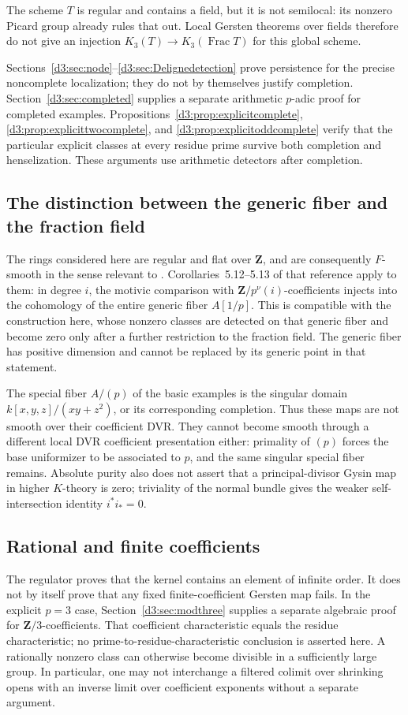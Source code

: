 \documentclass[11pt,a4paper]{amsart}
\numberwithin{equation}{section}
\theoremstyle{definition}
\theoremstyle{remark}
\newcommand{\Z}{\mathbf Z}
\newcommand{\Frac}{\operatorname{Frac}}
\begin{document}
The scheme $T$ is regular and contains a field, but it is not semilocal: its nonzero Picard group already rules that out. Local Gersten theorems over fields therefore do not give an injection $K_3(T)\to K_3(\Frac T)$ for this global scheme.

Sections~\ref{d3:sec:node}--\ref{d3:sec:Delignedetection} prove persistence for the precise noncomplete localization; they do not by themselves justify completion. Section~\ref{d3:sec:completed} supplies a separate arithmetic $p$-adic proof for completed examples. Propositions~\ref{d3:prop:explicitcomplete}, \ref{d3:prop:explicittwocomplete}, and \ref{d3:prop:explicitoddcomplete} verify that the particular explicit classes at every residue prime survive both completion and henselization. These arguments use arithmetic detectors after completion.

\subsection{The distinction between the generic fiber and the fraction field}
The rings considered here are regular and flat over $\Z$, and are consequently $F$-smooth in the sense relevant to \cite{BouisMotivic}. Corollaries~5.12--5.13 of that reference apply to them: in degree $i$, the motivic comparison with $\Z/p^\nu(i)$-coefficients injects into the cohomology of the entire generic fiber $A[1/p]$. This is compatible with the construction here, whose nonzero classes are detected on that generic fiber and become zero only after a further restriction to the fraction field. The generic fiber has positive dimension and cannot be replaced by its generic point in that statement.

The special fiber $A/(p)$ of the basic examples is the singular domain $k[x,y,z]/(xy+z^2)$, or its corresponding completion. Thus these maps are not smooth over their coefficient DVR. They cannot become smooth through a different local DVR coefficient presentation either: primality of $(p)$ forces the base uniformizer to be associated to $p$, and the same singular special fiber remains. Absolute purity also does not assert that a principal-divisor Gysin map in higher $K$-theory is zero; triviality of the normal bundle gives the weaker self-intersection identity $i^*i_*=0$.

\subsection{Rational and finite coefficients}
The regulator proves that the kernel contains an element of infinite order. It does not by itself prove that any fixed finite-coefficient Gersten map fails. In the explicit $p=3$ case, Section~\ref{d3:sec:modthree} supplies a separate algebraic proof for $\Z/3$-coefficients. That coefficient characteristic equals the residue characteristic; no prime-to-residue-characteristic conclusion is asserted here. A rationally nonzero class can otherwise become divisible in a sufficiently large group. In particular, one may not interchange a filtered colimit over shrinking opens with an inverse limit over coefficient exponents without a separate argument.
\end{document}

